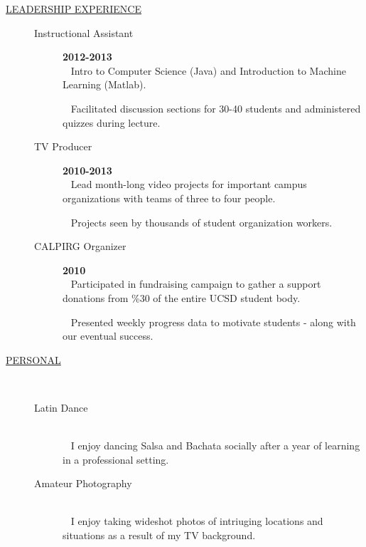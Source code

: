 \documentclass{article}
\begin{document}
\begin{description}
    \item[\underline{LEADERSHIP EXPERIENCE}] \hfill
        \vspace{-.1in}
        \begin{description} 
            \item[Instructional Assistant] \hfill \textbf{2012-2013}\\
                \textbullet ~ Intro to Computer Science (Java) and Introduction to Machine Learning (Matlab).

                \textbullet ~ Facilitated discussion sections for 30-40 students and administered 
                                quizzes during lecture.
            \item[TV Producer] \hfill \textbf{2010-2013}\\
                \textbullet ~ Lead month-long video projects for important campus organizations with
                                teams of three to four people.

                \textbullet ~ Projects seen by thousands of student organization workers.
            \item[CALPIRG Organizer] \hfill \textbf{2010}\\
                \textbullet ~ Participated in fundraising campaign to gather a support donations from 
                                \%30 of the entire UCSD student body.
                
                \textbullet ~ Presented weekly progress data to motivate students - along with our eventual success. 
        \end{description}

    \vspace{-.07in}
    \item[\underline{PERSONAL}] \hfill \\
        \vspace{-.07in}
        \begin{description}
            \item[Latin Dance] \hfill \\
                \textbullet ~ I enjoy dancing Salsa and Bachata socially after a year of learning in a professional setting.
            \item[Amateur Photography] \hfill \\
                \textbullet ~ I enjoy taking wideshot photos of intriuging locations and situations as a result of my TV background.
        \end{description}
	
\end{description}
\end{document}
